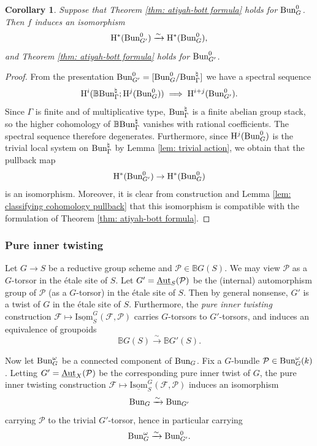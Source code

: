 \documentclass[reqno]{amsart}
\numberwithin{equation}{subsection}
\newtheorem{cor}[subsubsection]{Corollary}
\theoremstyle{definition}
\def\BB{\mathbb{B}}
\newcommand\cF{\mathcal{F}}
\newcommand\cP{\mathcal{P}}
\newcommand{\Bun}{\textup{Bun}}
\newcommand\Aut{\textup{Aut}}
\newcommand\na{\natural}
\newcommand{\ul}[1]{\underline{#1}}
\newcommand{\mrm}[1]{\mathrm{#1}}
\newcommand{\rH}{\ensuremath{\mathrm{H}}\xspace}
\begin{document}
\begin{cor}\label{cor: propagate central isogeny} Suppose that Theorem \ref{thm: atiyah-bott formula} holds for $\Bun_G^0$.
Then $f$ induces an isomorphism 
\[
\rH^*(\Bun_{G'}^0 ) \xrightarrow{\sim} \rH^*(\Bun_G^0),
\]
and Theorem \ref{thm: atiyah-bott formula} holds for $\Bun_{G'}^0$. 
\end{cor}

\begin{proof}From the presentation $\Bun_{G'}^0 = [\Bun_G^0/\Bun^{\na}_{\Gamma}]$ we have a spectral sequence 
\[
\rH^i(\BB\Bun^{\na}_{\Gamma}; \rH^j(\Bun_G^0)) \implies \rH^{i+j}(\Bun_{G'}^0).
\]
Since $\Gamma$ is finite and of multiplicative type, $\Bun^{\na}_{\Gamma}$ is a finite abelian group stack, so the higher cohomology of $\BB \Bun^{\na}_{\Gamma}$ vanishes with rational coefficients. The spectral sequence therefore degenerates. Furthermore, since $\rH^j(\Bun_G^0)$ is the trivial local system on $\Bun^{\na}_{\Gamma}$ by Lemma \ref{lem: trivial action}, we obtain that the pullback map 
\[
\rH^*(\Bun_{G'}^0) \rightarrow \rH^*(\Bun_G^0)
\]
is an isomorphism. Moreover, it is clear from construction and Lemma \ref{lem: classifying cohomology pullback} that this isomorphism is compatible with the formulation of Theorem \ref{thm: atiyah-bott formula}. 
\end{proof}


\subsubsection{Pure inner twisting}\label{sssec:pure-inner-twist}
Let $G \rightarrow S$ be a reductive group scheme and $\cP \in \BB G(S)$. We may view $\cP$ as a $G$-torsor in the \'etale site of $S$. Let $G' = \ul{\Aut}_S(\cP)$ be the (internal) automorphism group of $\cP$ (as a $G$-torsor) in the \'etale site of $S$. Then by general nonsense, $G'$ is a twist of $G$ in the \'etale site of $S$. Furthermore, the \emph{pure inner twisting} construction $\cF \mapsto \ul{\mrm{Isom}}_S^G(\cF, \cP)$ carries $G$-torsors to $G'$-torsors, and induces an equivalence of groupoids
\[
\BB G(S) \xrightarrow{\sim} \BB G'(S).
\]

Now let $\Bun_G^\omega$ be a connected component of $\Bun_G$. Fix a $G$-bundle $\cP \in \Bun_G^\omega (k)$. Letting $G' = \ul{\Aut}_X(\cP)$ be the corresponding pure inner twist of $G$, the pure inner twisting construction $\cF \mapsto \ul{\mrm{Isom}}_S^G(\cF, \cP)$ induces an isomorphism 
\[
\Bun_G \xrightarrow{\sim} \Bun_{G'}
\]
carrying $\cP$ to the trivial $G'$-torsor, hence in particular carrying
\[
\Bun_G^\omega \xrightarrow{\sim} \Bun_{G'}^0.
\]
\end{document}
